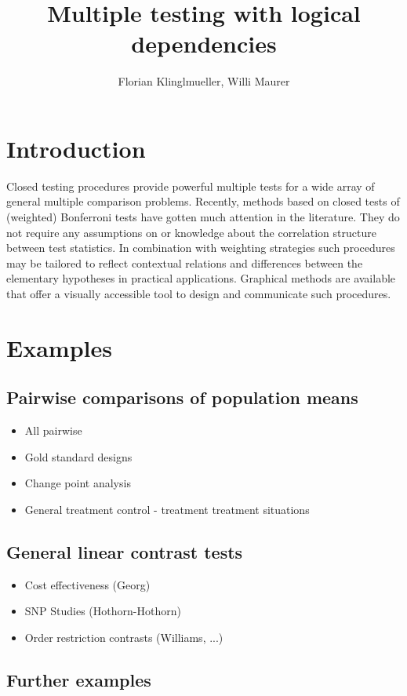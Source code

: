 \documentclass[a4paper,12pt]{article}
\title{Multiple testing with logical dependencies}
\author{Florian Klinglmueller, Willi Maurer}
\date{}
\begin{document}
\maketitle

\section{Introduction}

Closed testing procedures provide powerful multiple tests for a wide
array of general multiple comparison problems. Recently, methods based
on closed tests of (weighted) Bonferroni tests have gotten much
attention in the literature. They do not require any assumptions on or
knowledge about the correlation structure between test statistics. In
combination with weighting strategies such procedures may be tailored
to reflect contextual relations and differences between the elementary
hypotheses in practical applications. Graphical methods are available
that offer a visually accessible tool to design and communicate such
procedures.

\section{Examples}

\subsection{Pairwise comparisons of population means}
\begin{itemize}
\item All pairwise
\item Gold standard designs
\item Change point analysis
\item General treatment control - treatment treatment situations
\end{itemize}

\subsection{General linear contrast tests}
\begin{itemize}
\item Cost effectiveness (Georg)
\item SNP Studies (Hothorn-Hothorn)
\item Order restriction contrasts (Williams, ...)
\end{itemize}

\subsection{Further examples}
\end{document}
